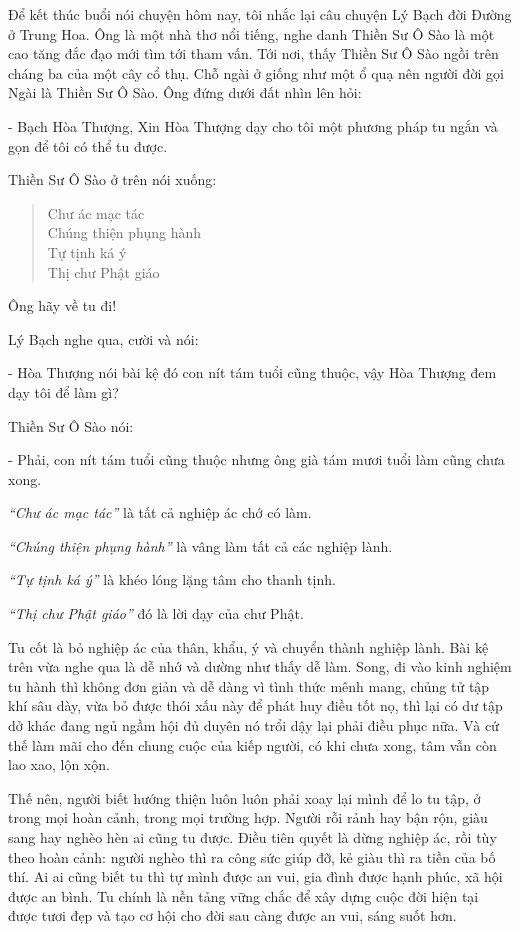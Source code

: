 \documentclass[
  12pt,
  oneside]{book}
\begin{document}
Để kết thúc buổi nói chuyện hôm nay, tôi nhắc lại câu chuyện Lý Bạch đời Đường ở Trung Hoa. Ông là một nhà thơ nổi tiếng, nghe danh Thiền Sư Ô Sào là một cao tăng đắc đạo mới tìm tới tham vấn. Tới nơi, thấy Thiền Sư Ô Sào ngồi trên cháng ba của một cây cổ thụ. Chỗ ngài ở giống như một ổ quạ nên người đời gọi Ngài là Thiền Sư Ô Sào. Ông đứng dưới đất nhìn lên hỏi:

- Bạch Hòa Thượng, Xin Hòa Thượng dạy cho tôi một phương pháp tu ngắn và gọn để tôi có thể tu được.

Thiền Sư Ô Sào ở trên nói xuống:

\begin{quote}
Chư ác mạc tác\\
Chúng thiện phụng hành\\
Tự tịnh ká ý\\
Thị chư Phật giáo
\end{quote}

Ông hãy về tu đi!

Lý Bạch nghe qua, cười và nói:

- Hòa Thượng nói bài kệ đó con nít tám tuổi cũng thuộc, vậy Hòa Thượng đem dạy tôi để làm gì?

Thiền Sư Ô Sào nói:

- Phải, con nít tám tuổi cũng thuộc nhưng ông già tám mươi tuổi làm cũng chưa xong.

\emph{``Chư ác mạc tác''} là tất cả nghiệp ác chớ có làm.

\emph{``Chúng thiện phụng hành''} là vâng làm tất cả các nghiệp lành.

\emph{``Tự tịnh ká ý''} là khéo lóng lặng tâm cho thanh tịnh.

\emph{``Thị chư Phật giáo''} đó là lời dạy của chư Phật.

Tu cốt là bỏ nghiệp ác của thân, khẩu, ý và chuyển thành nghiệp lành. Bài kệ trên vừa nghe qua là dễ nhớ và dường như thấy dễ làm. Song, đi vào kinh nghiệm tu hành thì không đơn giản và dễ dàng vì tình thức mênh mang, chủng tử tập khí sâu dày, vừa bỏ được thói xấu này để phát huy điều tốt nọ, thì lại có dư tập dở khác đang ngủ ngầm hội đủ duyên nó trổi dậy lại phải điều phục nữa. Và cứ thế làm mãi cho đến chung cuộc của kiếp người, có khi chưa xong, tâm vẫn còn lao xao, lộn xộn.

Thế nên, người biết hướng thiện luôn luôn phải xoay lại mình để lo tu tập, ở trong mọi hoàn cảnh, trong mọi trường hợp. Người rỗi rảnh hay bận rộn, giàu sang hay nghèo hèn ai cũng tu được. Điều tiên quyết là dừng nghiệp ác, rồi tùy theo hoàn cảnh: người nghèo thì ra công sức giúp đỡ, kẻ giàu thì ra tiền của bố thí. Ai ai cũng biết tu thì tự mình được an vui, gia đình được hạnh phúc, xã hội được an bình. Tu chính là nền tảng vững chắc để xây dựng cuộc đời hiện tại được tươi đẹp và tạo cơ hội cho đời sau càng được an vui, sáng suốt hơn.
\end{document}
